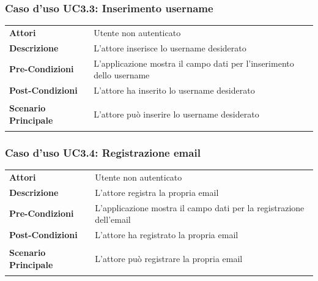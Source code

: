 \subsubsection{Caso d'uso UC3.3: Inserimento username}
\label{UC3_3}

\begin{longtable}{ l | p{11cm}}
	\hline
	\rowcolor{Gray}
	 \multicolumn{2}{c}{UC3.3: Inserimento username} \\
	 \hline
	\textbf{Attori} & Utente non autenticato \\
	\textbf{Descrizione} & L'attore inserisce lo username desiderato \\
	\textbf{Pre-Condizioni} & L'applicazione mostra il campo dati per l'inserimento dello username \\
	\textbf{Post-Condizioni} & L'attore ha inserito lo username desiderato \\
	\textbf{Scenario Principale} & 
	\begin{enumerate*}[label=(\arabic*.),itemjoin={\newline}]
		\item L'attore può inserire lo username desiderato
	\end{enumerate*}\\
\end{longtable}

\subsubsection{Caso d'uso UC3.4: Registrazione email}
\label{UC3_4}

\begin{longtable}{ l | p{11cm}}
	\hline
	\rowcolor{Gray}
	 \multicolumn{2}{c}{UC3.4 - Registrazione email} \\
	 \hline
	\textbf{Attori} & Utente non autenticato \\
	\textbf{Descrizione} & L'attore registra la propria email \\
	\textbf{Pre-Condizioni} & L'applicazione mostra il campo dati per la registrazione dell'email \\
	\textbf{Post-Condizioni} & L'attore ha registrato la propria email \\
	\textbf{Scenario Principale} & 
	\begin{enumerate*}[label=(\arabic*.),itemjoin={\newline}]
		\item L'attore può registrare la propria email
	\end{enumerate*}
\end{longtable}

